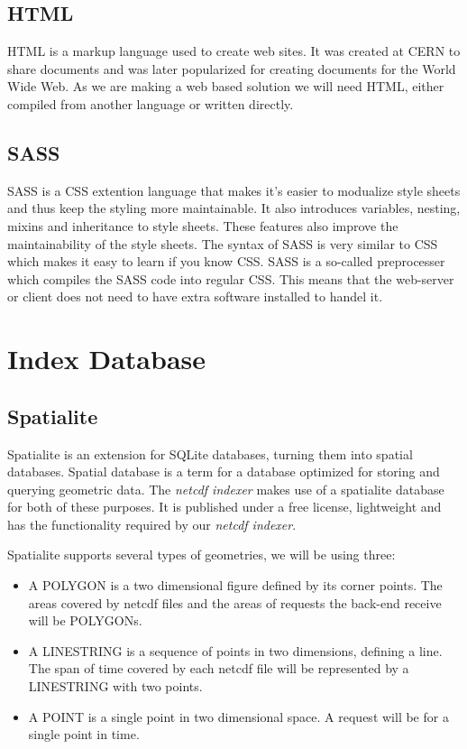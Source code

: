 \documentclass[11pt,a4paper,titlepage,oneside]{report}
\begin{document}
\subsection{HTML}
  \gls{HTML} is a markup language used to create web sites. It was created at CERN to share documents and was later popularized for creating documents for the World Wide Web. As we are making a web based solution we will need \gls{HTML}, either compiled from another language or written directly.
  \subsection{SASS}
  \gls{SASS} is a \gls{CSS} extention language that makes it's easier to modualize style sheets and thus keep the styling more maintainable. It also introduces variables, nesting, mixins and inheritance to style sheets. These features also improve the maintainability of the style sheets. The syntax of \gls{SASS} is very similar to \gls{CSS} which makes it easy to learn if you know \gls{CSS}. \gls{SASS} is a so-called preprocesser which compiles the \gls{SASS} code into regular \gls{CSS}. This means that the web-server or client does not need to have extra software installed to handel it.
  
\section{Index Database}
  \subsection{Spatialite}
  Spatialite is an extension for SQLite databases, turning them into spatial databases. Spatial database is a term for a database optimized for storing and querying geometric data. The \textit{\gls{netcdf} indexer} makes use of a spatialite database for both of these purposes. It is published under a free license, lightweight and has the functionality required by our \textit{\gls{netcdf} indexer}.
  
  Spatialite supports several types of geometries, we will be using three:
  \begin{itemize}
\item A POLYGON is a two dimensional figure defined by its corner points. The areas covered by \gls{netcdf} files and the areas of requests the back-end receive will be POLYGONs.
\item A LINESTRING is a sequence of points in two dimensions, defining a line. The span of time covered by each \gls{netcdf} file will be represented by a LINESTRING with two points.
\item A POINT is a single point in two dimensional space. A request will be for a single point in time.
\end{itemize}
\end{document}
